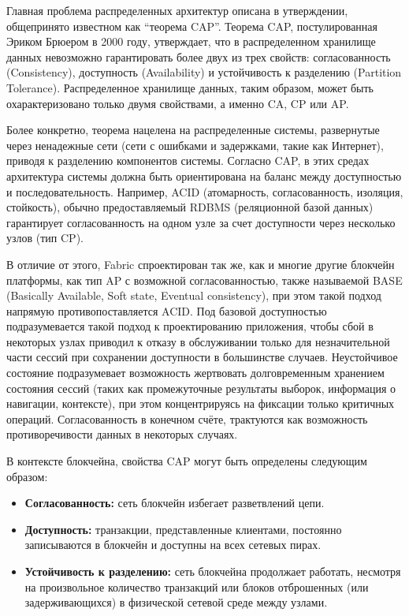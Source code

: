 Главная проблема распределенных архитектур описана в утверждении, общепринято известном как “теорема CAP”. Теорема CAP, постулированная Эриком Брюером в 2000 году, утверждает, что в распределенном хранилище данных невозможно гарантировать более двух из трех свойств: согласованность (Consistency), доступность (Availability) и устойчивость к разделению (Partition Tolerance). Распределенное хранилище данных, таким образом, может быть охарактеризовано только двумя свойствами, а именно CA, CP или AP.

Более конкретно, теорема нацелена на распределенные системы, развернутые через ненадежные сети (сети с ошибками и задержками, такие как Интернет), приводя к разделению компонентов системы. Согласно CAP, в этих средах архитектура системы должна быть ориентирована на баланс между доступностью и последовательность. Например, ACID (атомарность, согласованность, изоляция,
стойкость), обычно предоставляемый RDBMS (реляционной базой данных) гарантирует согласованность на одном узле за счет доступности через несколько узлов (тип CP).

В отличие от этого, Fabric спроектирован так же, как и многие другие блокчейн платформы, как тип AP с возможной согласованностью, также называемой BASE (Basically Available, Soft state, Eventual consistency), при этом такой подход напрямую противопоставляется ACID. Под базовой доступностью подразумевается такой подход к проектированию приложения, чтобы сбой в некоторых узлах приводил к отказу в обслуживании только для незначительной части сессий при сохранении доступности в большинстве случаев. Неустойчивое состояние подразумевает возможность жертвовать долговременным хранением состояния сессий (таких как промежуточные результаты выборок, информация о навигации, контексте), при этом концентрируясь на фиксации только критичных операций. Согласованность в конечном счёте, трактуются как возможность противоречивости данных в некоторых случаях.

В контексте блокчейна, свойства CAP могут быть определены следующим образом:
\begin{itemize}
	\item \textbf{Согласованность:} сеть блокчейн избегает разветвлений цепи.
	\item \textbf{Доступность:} транзакции, представленные клиентами, постоянно записываются в блокчейн и доступны на всех сетевых пирах.
	\item \textbf{Устойчивость к разделению:} сеть блокчейна продолжает работать, несмотря на произвольное количество транзакций или блоков отброшенных (или задерживающихся) в физической сетевой среде между узлами.
\end{itemize}

